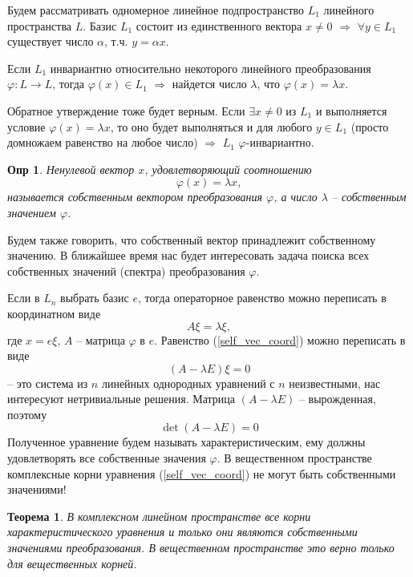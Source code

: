 \documentclass[a4paper,12pt]{article}
\newtheorem*{definition}{Опр}
\newtheorem{theorem}{Теорема}[section]
\begin{document}
Будем рассматривать одномерное линейное подпространство $L_1$ линейного пространства $L$. Базис $L_1$ состоит из единственного вектора $x \ne 0$ $\Rightarrow$ $\forall y \in L_1$ существует число $\alpha$, т.ч. $y = \alpha x$.

Если $L_1$ инвариантно относительно некоторого линейного преобразования $\varphi: L \to L$, тогда $\varphi(x) \in L_1$ $\Rightarrow$ найдется число $\lambda$, что $\varphi(x) = \lambda x$.
	
Обратное утверждение тоже будет верным. Если $\exists x \ne 0$ из $L_1$ и выполняется условие $\varphi(x) = \lambda x$, то оно будет выполняться и для любого $y \in L_1$ (просто домножаем равенство на любое число) $\Rightarrow$ $L_1$ $\varphi$-инвариантно.

\begin{definition}
	Ненулевой вектор $x$, удовлетворяющий соотношению 
	\begin{equation}
		\varphi(x) = \lambda x, 
	\end{equation}
	называется собственным вектором преобразования $\varphi$, а число $\lambda$ -- собственным значением $\varphi$. 
\end{definition}

Будем также говорить, что собственный вектор принадлежит собственному значению. В ближайшее время нас будет интересовать задача поиска всех собственных значений (спектра) преобразования $\varphi$. 

Если в $L_n$ выбрать базис $e$, тогда операторное равенство можно переписать в координатном виде
\begin{equation} \label{self_vec_coord}
	A \xi = \lambda \xi,
\end{equation}
где $x = e \xi$, $A$ -- матрица $\varphi$ в $e$. Равенство (\ref{self_vec_coord}) можно переписать в виде 
\begin{equation}
	(A - \lambda E) \xi = 0
\end{equation}
-- это система из $n$ линейных однородных уравнений с $n$ неизвестными, нас интересуют нетривиальные решения. Матрица $(A - \lambda E)$ -- вырожденная, поэтому 
\begin{equation}
	\det (A - \lambda E) = 0
\end{equation}
Полученное уравнение будем называть характеристическим, ему должны удовлетворять все собственные значения $\varphi$. В вещественном пространстве комплексные корни уравнения (\ref{self_vec_coord}) не могут быть собственными значениями!

\begin{theorem}
	В комплексном линейном пространстве все корни характеристического уравнения и только они являются собственными значениями преобразования. В вещественном пространстве это верно только для вещественных корней.
\end{theorem}
\end{document}
